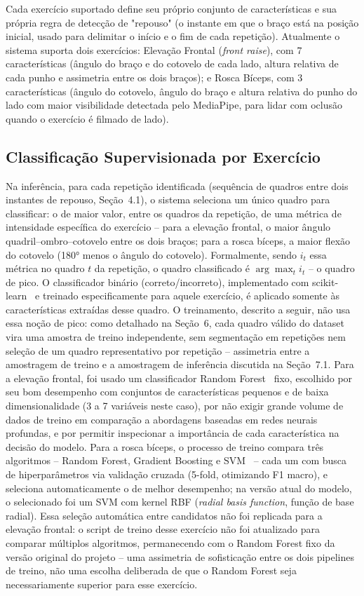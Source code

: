 \documentclass[12pt]{article}
\begin{document}
Cada exercício suportado define seu próprio conjunto de características e
sua própria regra de detecção de "repouso" (o instante em que o braço está
na posição inicial, usado para delimitar o início e o fim de cada
repetição). Atualmente o sistema suporta dois exercícios: Elevação Frontal
(\textit{front raise}), com 7 características (ângulo do braço e do
cotovelo de cada lado, altura relativa de cada punho e assimetria entre os
dois braços); e Rosca Bíceps, com 3 características (ângulo do cotovelo,
ângulo do braço e altura relativa do punho do lado com maior visibilidade
detectada pelo MediaPipe, para lidar com oclusão quando o exercício é
filmado de lado).

\subsection{Classificação Supervisionada por Exercício}

Na inferência, para cada repetição identificada (sequência de quadros
entre dois instantes de repouso, Seção~4.1), o sistema seleciona um único
quadro para classificar: o de maior valor, entre os quadros da repetição,
de uma métrica de intensidade específica do exercício -- para a elevação
frontal, o maior ângulo quadril--ombro--cotovelo entre os dois braços; para
a rosca bíceps, a maior flexão do cotovelo (180° menos o ângulo do
cotovelo). Formalmente, sendo $i_t$ essa métrica no quadro $t$ da
repetição, o quadro classificado é $\arg\max_t i_t$ -- o quadro de pico. O
classificador binário (correto/incorreto), implementado com
scikit-learn~\cite{pedregosa2011scikit} e treinado especificamente para
aquele exercício, é aplicado somente às características extraídas desse
quadro. O treinamento, descrito a seguir, não usa essa noção de pico: como
detalhado na Seção~6, cada quadro válido do dataset vira uma amostra de
treino independente, sem segmentação em repetições nem seleção de um
quadro representativo por repetição -- assimetria entre a amostragem de
treino e a amostragem de inferência discutida na Seção~7.1. Para a
elevação frontal, foi usado um classificador
Random Forest~\cite{breiman2001random} fixo, escolhido por seu bom
desempenho com conjuntos de características pequenos e de baixa
dimensionalidade (3 a 7 variáveis neste caso), por não exigir grande
volume de dados de treino em comparação a abordagens baseadas em redes
neurais profundas, e por permitir inspecionar a importância de cada
característica na decisão do modelo. Para a rosca bíceps, o processo de
treino compara três algoritmos -- Random Forest, Gradient Boosting e
SVM~\cite{cortes1995svm} -- cada um com busca de hiperparâmetros via
validação cruzada (5-fold, otimizando F1 macro), e seleciona
automaticamente o de melhor desempenho; na versão atual do modelo, o
selecionado foi um SVM com kernel RBF (\textit{radial basis function},
função de base radial). Essa seleção automática entre
candidatos não foi replicada para a elevação frontal: o script de treino
desse exercício não foi atualizado para comparar múltiplos algoritmos,
permanecendo com o Random Forest fixo da versão original do projeto --
uma assimetria de sofisticação entre os dois pipelines de treino, não uma
escolha deliberada de que o Random Forest seja necessariamente superior
para esse exercício.
\end{document}
